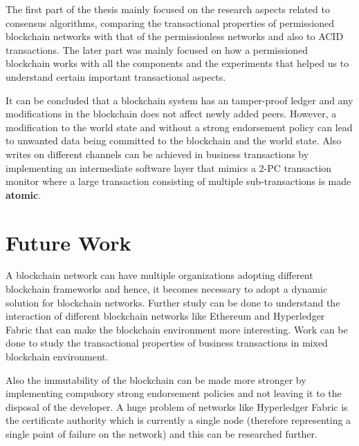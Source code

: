 \documentclass[
  a4paper,  %
  twoside,  %
  bibliography=totoc,
  headsepline,
  cleardoublepage=empty,
  parskip=half,
  draft=false
]{scrbook}
\begin{document}
The first part of the thesis mainly focused on the research aspects related to consensus algorithms, comparing the transactional properties of permissioned blockchain networks with that of the permissionless networks and also to ACID transactions. The later part was mainly focused on how a permissioned blockchain works with all the components and the experiments that helped us to understand certain important transactional aspects. 

It can be concluded that a blockchain system has an tamper-proof ledger and any modifications in the blockchain does not affect newly added peers. However, a modification to the world state and without a strong endorsement policy can lead to unwanted data being committed to the blockchain and the world state. Also writes on different channels can be achieved in business transactions by implementing an intermediate software layer that mimics a 2-PC transaction monitor where a large transaction consisting of multiple sub-transactions is made \textbf{atomic}. 

\section*{Future Work}
A blockchain network can have multiple organizations adopting different blockchain frameworks and hence, it becomes necessary to adopt a dynamic solution for blockchain networks. Further study can be done to understand the interaction of different blockchain networks like Ethereum and Hyperledger Fabric that can make the blockchain environment more interesting. Work can be done to study the transactional properties of business transactions in mixed blockchain environment.

Also the immutability of the blockchain can be made more stronger by implementing compulsory strong endorsement policies and not leaving it to the disposal of the developer. A huge problem of networks like Hyperledger Fabric is the certificate authority which is currently a single node (therefore representing a single point of failure on the network) and this can be researched further.

\printbibliography

\appendix
%

\pagestyle{empty}
\renewcommand*{\chapterpagestyle}{empty}
\Versicherung
\end{document}
